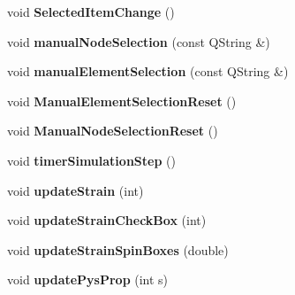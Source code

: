 \begin{DoxyCompactItemize}
\item 
\hypertarget{classMainWindow_ab2c0d4d0d84826cc032a45ea4783dde5}{}void {\bfseries Selected\+Item\+Change} ()\label{classMainWindow_ab2c0d4d0d84826cc032a45ea4783dde5}

\item 
\hypertarget{classMainWindow_a99f4fa67c708306ecac0eb351c6968d6}{}void {\bfseries manual\+Node\+Selection} (const Q\+String \&)\label{classMainWindow_a99f4fa67c708306ecac0eb351c6968d6}

\item 
\hypertarget{classMainWindow_af6253ec8c287b675a80e80bdd0ad31cc}{}void {\bfseries manual\+Element\+Selection} (const Q\+String \&)\label{classMainWindow_af6253ec8c287b675a80e80bdd0ad31cc}

\item 
\hypertarget{classMainWindow_ad613f2de4daee9c84828dc0490b00ffa}{}void {\bfseries Manual\+Element\+Selection\+Reset} ()\label{classMainWindow_ad613f2de4daee9c84828dc0490b00ffa}

\item 
\hypertarget{classMainWindow_a52630b918235794e8ff6cfd6abfc4b7f}{}void {\bfseries Manual\+Node\+Selection\+Reset} ()\label{classMainWindow_a52630b918235794e8ff6cfd6abfc4b7f}

\item 
\hypertarget{classMainWindow_a59dd1f2fe0d6900a98feff45c94e23e6}{}void {\bfseries timer\+Simulation\+Step} ()\label{classMainWindow_a59dd1f2fe0d6900a98feff45c94e23e6}

\item 
\hypertarget{classMainWindow_a0dce0c101c73abe3b5f347cd4dacfbd3}{}void {\bfseries update\+Strain} (int)\label{classMainWindow_a0dce0c101c73abe3b5f347cd4dacfbd3}

\item 
\hypertarget{classMainWindow_a99a35d2b2c33a4cadab365403816c15c}{}void {\bfseries update\+Strain\+Check\+Box} (int)\label{classMainWindow_a99a35d2b2c33a4cadab365403816c15c}

\item 
\hypertarget{classMainWindow_a18d28bd55cc52f4b81d1c09e655d9711}{}void {\bfseries update\+Strain\+Spin\+Boxes} (double)\label{classMainWindow_a18d28bd55cc52f4b81d1c09e655d9711}

\item 
\hypertarget{classMainWindow_a524bf8d075a209be107c5ee9cd750bba}{}void {\bfseries update\+Pys\+Prop} (int s)\label{classMainWindow_a524bf8d075a209be107c5ee9cd750bba}


\end{DoxyCompactItemize}
